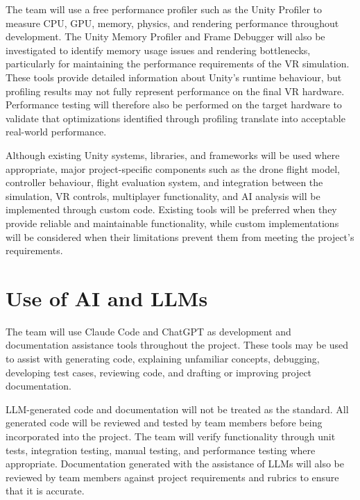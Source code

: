 \documentclass{article}
\begin{document}
\vspace{0.75em}

\noindent The team will use a free performance profiler such as the Unity Profiler to measure CPU, GPU, memory, physics, and rendering performance throughout development. The Unity Memory Profiler and Frame Debugger will also be investigated to identify memory usage issues and rendering bottlenecks, particularly for maintaining the performance requirements of the VR simulation. These tools provide detailed information about Unity's runtime behaviour, but profiling results may not fully represent performance on the final VR hardware. Performance testing will therefore also be performed on the target hardware to validate that optimizations identified through profiling translate into acceptable real-world performance.

\vspace{0.75em}

\noindent Although existing Unity systems, libraries, and frameworks will be used where appropriate, major project-specific components such as the drone flight model, controller behaviour, flight evaluation system, and integration between the simulation, VR controls, multiplayer functionality, and AI analysis will be implemented through custom code. Existing tools will be preferred when they provide reliable and maintainable functionality, while custom implementations will be considered when their limitations prevent them from meeting the project's requirements. 




\section{Use of AI and LLMs}

\noindent The team will use Claude Code and ChatGPT as development and documentation assistance tools throughout the project. These tools may be used to assist with generating code, explaining unfamiliar concepts, debugging, developing test cases, reviewing code, and drafting or improving project documentation.

\vspace{0.75em}

\noindent LLM-generated code and documentation will not be treated as the standard. All generated code will be reviewed and tested by team members before being incorporated into the project. The team will verify functionality through unit tests, integration testing, manual testing, and performance testing where appropriate. Documentation generated with the assistance of LLMs will also be reviewed by team members against project requirements and rubrics to ensure that it is accurate.
\end{document}
